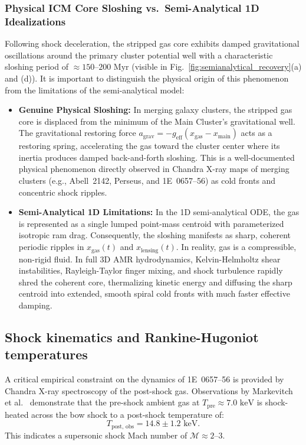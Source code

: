 \documentclass[aps,prd,reprint,superscriptaddress,nofootinbib,floatfix,amsmath,amssymb]{revtex4-2}
\begin{document}
\subsubsection{Physical ICM Core Sloshing vs.\ Semi-Analytical 1D Idealizations}

Following shock deceleration, the stripped gas core exhibits damped gravitational oscillations around the primary cluster potential well with a characteristic sloshing period of $\approx 150\text{--}200\text{ Myr}$ (visible in Fig.~\ref{fig:semianalytical_recovery}(a) and (d)). It is important to distinguish the physical origin of this phenomenon from the limitations of the semi-analytical model:
\begin{itemize}
    \item \textbf{Genuine Physical Sloshing:} In merging galaxy clusters, the stripped gas core is displaced from the minimum of the Main Cluster's gravitational well. The gravitational restoring force $a_{\text{grav}} = -g_{\text{eff}}(x_{\text{gas}} - x_{\text{main}})$ acts as a restoring spring, accelerating the gas toward the cluster center where its inertia produces damped back-and-forth sloshing. This is a well-documented physical phenomenon directly observed in Chandra X-ray maps of merging clusters (e.g., Abell~2142, Perseus, and 1E~0657--56) as cold fronts and concentric shock ripples.
    \item \textbf{Semi-Analytical 1D Limitations:} In the 1D semi-analytical ODE, the gas is represented as a single lumped point-mass centroid with parameterized isotropic ram drag. Consequently, the sloshing manifests as sharp, coherent periodic ripples in $x_{\text{gas}}(t)$ and $x_{\text{lensing}}(t)$. In reality, gas is a compressible, non-rigid fluid. In full 3D AMR hydrodynamics, Kelvin-Helmholtz shear instabilities, Rayleigh-Taylor finger mixing, and shock turbulence rapidly shred the coherent core, thermalizing kinetic energy and diffusing the sharp centroid into extended, smooth spiral cold fronts with much faster effective damping.
\end{itemize}

\subsection{Shock kinematics and Rankine-Hugoniot temperatures}

A critical empirical constraint on the dynamics of 1E~0657--56 is provided by Chandra X-ray spectroscopy of the post-shock gas. Observations by Markevitch et al.~\cite{Markevitch2004_Bullet} demonstrate that the pre-shock ambient gas at $T_{\text{pre}} \approx 7.0\text{ keV}$ is shock-heated across the bow shock to a post-shock temperature of:
\begin{equation}
T_{\text{post, obs}} = 14.8 \pm 1.2\text{ keV}.
\label{eq:obs_temp}
\end{equation}
This indicates a supersonic shock Mach number of $\mathcal{M} \approx 2\text{--}3$.
\end{document}
